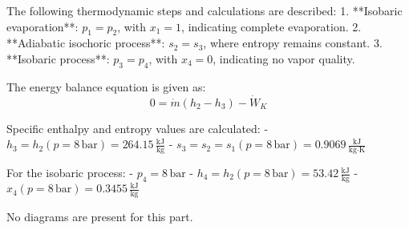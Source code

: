 The following thermodynamic steps and calculations are described:  
1. **Isobaric evaporation**: \(p_1 = p_2\), with \(x_1 = 1\), indicating complete evaporation.  
2. **Adiabatic isochoric process**: \(s_2 = s_3\), where entropy remains constant.  
3. **Isobaric process**: \(p_3 = p_4\), with \(x_4 = 0\), indicating no vapor quality.  

The energy balance equation is given as:  
\[
0 = \dot{m} (h_2 - h_3) - \dot{W}_K
\]  

Specific enthalpy and entropy values are calculated:  
- \(h_3 = h_2(p = 8 \, \text{bar}) = 264.15 \, \frac{\text{kJ}}{\text{kg}}\)  
- \(s_3 = s_2 = s_1(p = 8 \, \text{bar}) = 0.9069 \, \frac{\text{kJ}}{\text{kg·K}}\)  

For the isobaric process:  
- \(p_4 = 8 \, \text{bar}\)  
- \(h_4 = h_2(p = 8 \, \text{bar}) = 53.42 \, \frac{\text{kJ}}{\text{kg}}\)  
- \(x_4(p = 8 \, \text{bar}) = 0.3455 \, \frac{\text{kJ}}{\text{kg}}\)  

No diagrams are present for this part.